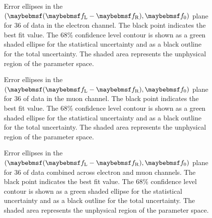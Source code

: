 \begin{figure}[h!]
\centering
{}\quad
{}
\caption[Error ellipses in the $(\fLmfR, \f0)$ plane for the electron
channel]{Error ellipses in the $(\fLmfR, \f0)$ plane for \unit{36}{\invpb} of
  data in the electron channel. The black point indicates the best fit
  value. The 68\% confidence level contour is shown as a green shaded ellipse
  for the statistical uncertainty and as a black outline for the total
  uncertainty. The shaded area represents the unphysical region of the parameter
  space.}
\label{fig:wpol_contour_ele}
\end{figure}

\begin{figure}[h!]
\centering
{}\quad
{}
\caption[Error ellipses in the $(\fLmfR, \f0)$ plane for the muon channel]{Error ellipses in the $(\fLmfR, \f0)$ plane for
  \unit{36}{\invpb} of data in the muon channel. The black point indicates the
  best fit value. The 68\% confidence level contour is shown as a green shaded
  ellipse for the statistical uncertainty and as a black outline for the total
  uncertainty. The shaded area represents the unphysical region of the parameter
  space.}
\label{fig:wpol_contour_mu}
\end{figure}


\begin{figure}[h!]
\centering
{}\quad
{}
\caption[Error ellipses in the $(\fLmfR, \f0)$ plane for the combined fit]{Error ellipses in the $(\fLmfR, \f0)$ plane for
  \unit{36}{\invpb} of data combined across electron and muon channels. The
  black point indicates the best fit value. The 68\% confidence level contour is
  shown as a green shaded ellipse for the statistical uncertainty and as a black
  outline for the total uncertainty. The shaded area represents the unphysical
  region of the parameter space.}
\label{fig:wpol_contour_comb}
\end{figure}


